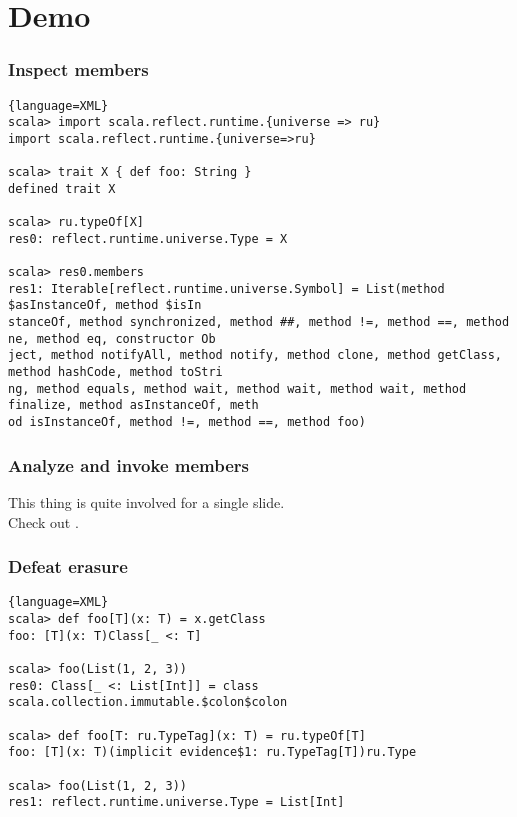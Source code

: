 \documentclass[hyperref={bookmarks=false}]{beamer}
\begin{document}
\section{Demo}

\begin{frame}[fragile]
\frametitle{Inspect members}

\begin{lstlisting}{language=XML}
scala> import scala.reflect.runtime.{universe => ru}
import scala.reflect.runtime.{universe=>ru}

scala> trait X { def foo: String }
defined trait X

scala> ru.typeOf[X]
res0: reflect.runtime.universe.Type = X

scala> res0.members
res1: Iterable[reflect.runtime.universe.Symbol] = List(method $asInstanceOf, method $isIn
stanceOf, method synchronized, method ##, method !=, method ==, method ne, method eq, constructor Ob
ject, method notifyAll, method notify, method clone, method getClass, method hashCode, method toStri
ng, method equals, method wait, method wait, method wait, method finalize, method asInstanceOf, meth
od isInstanceOf, method !=, method ==, method foo)
\end{lstlisting}
\end{frame}

\begin{frame}[fragile]
\frametitle{Analyze and invoke members}

This thing is quite involved for a single slide.\\ Check out
.

\end{frame}

\begin{frame}[fragile]
\frametitle{Defeat erasure}

\begin{lstlisting}{language=XML}
scala> def foo[T](x: T) = x.getClass
foo: [T](x: T)Class[_ <: T]

scala> foo(List(1, 2, 3))
res0: Class[_ <: List[Int]] = class scala.collection.immutable.$colon$colon

scala> def foo[T: ru.TypeTag](x: T) = ru.typeOf[T]
foo: [T](x: T)(implicit evidence$1: ru.TypeTag[T])ru.Type

scala> foo(List(1, 2, 3))
res1: reflect.runtime.universe.Type = List[Int]
\end{lstlisting}
\end{frame}
\end{document}
